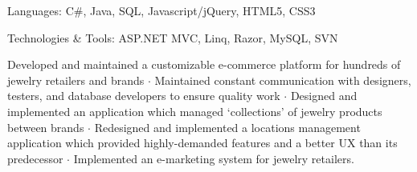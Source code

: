 \documentclass[11pt]{article}
\newcommand{\smaller}{\fontsize{9}{11}\selectfont}
\begin{document}
\begin{description}
	\setlength{\itemsep}{2pt}\small\begin{spacing}{1.2}
	
	\item[\smaller Languages:] {\small C\#, Java, SQL, Javascript/jQuery, HTML5, CSS3}
	\item[\smaller Technologies \& Tools:] {\small ASP.NET MVC, Linq, Razor, MySQL, SVN}
	
	\end{spacing}
\end{description}

\vspace{-.25cm}

\noindent        Developed and maintained a customizable e-commerce platform for hundreds of jewelry retailers and brands
{\large $\cdot$} Maintained constant communication with designers, testers, and database developers to ensure quality work
{\large $\cdot$} Designed and implemented an application which managed `collections' of jewelry products between brands
{\large $\cdot$} Redesigned and implemented a locations management application which provided highly-demanded features and a better UX than its predecessor
{\large $\cdot$} Implemented an e-marketing system for jewelry retailers.
\end{document}

